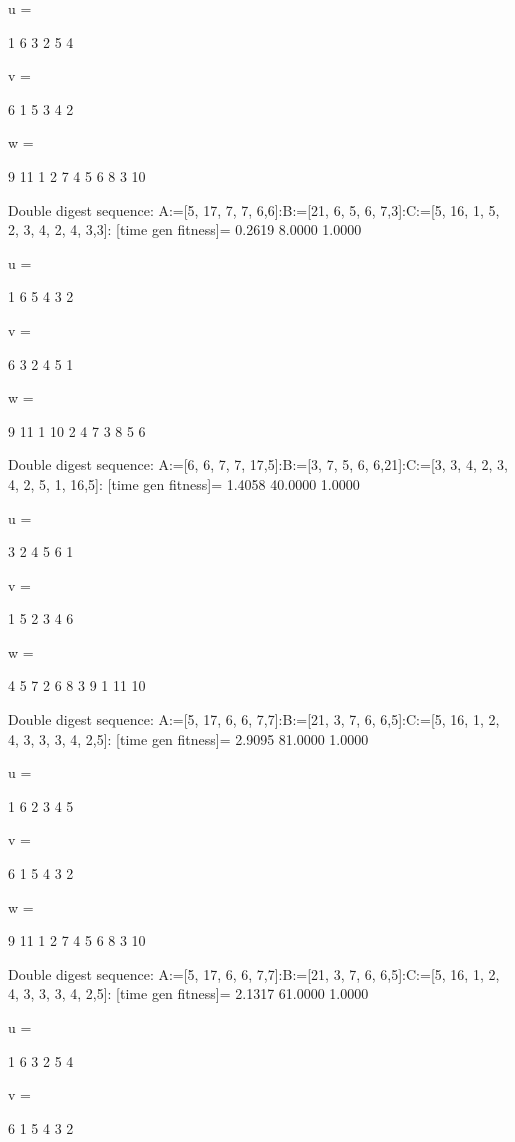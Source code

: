 u =

     1     6     3     2     5     4


v =

     6     1     5     3     4     2


w =

     9    11     1     2     7     4     5     6     8     3    10

Double digest sequence:
A:=[5, 17, 7, 7, 6,6]:B:=[21, 6, 5, 6, 7,3]:C:=[5, 16, 1, 5, 2, 3, 4, 2, 4, 3,3]:
[time gen fitness]=
    0.2619    8.0000    1.0000


u =

     1     6     5     4     3     2


v =

     6     3     2     4     5     1


w =

     9    11     1    10     2     4     7     3     8     5     6

Double digest sequence:
A:=[6, 6, 7, 7, 17,5]:B:=[3, 7, 5, 6, 6,21]:C:=[3, 3, 4, 2, 3, 4, 2, 5, 1, 16,5]:
[time gen fitness]=
    1.4058   40.0000    1.0000


u =

     3     2     4     5     6     1


v =

     1     5     2     3     4     6


w =

     4     5     7     2     6     8     3     9     1    11    10

Double digest sequence:
A:=[5, 17, 6, 6, 7,7]:B:=[21, 3, 7, 6, 6,5]:C:=[5, 16, 1, 2, 4, 3, 3, 3, 4, 2,5]:
[time gen fitness]=
    2.9095   81.0000    1.0000


u =

     1     6     2     3     4     5


v =

     6     1     5     4     3     2


w =

     9    11     1     2     7     4     5     6     8     3    10

Double digest sequence:
A:=[5, 17, 6, 6, 7,7]:B:=[21, 3, 7, 6, 6,5]:C:=[5, 16, 1, 2, 4, 3, 3, 3, 4, 2,5]:
[time gen fitness]=
    2.1317   61.0000    1.0000


u =

     1     6     3     2     5     4


v =

     6     1     5     4     3     2


